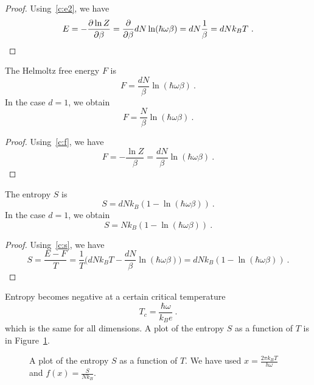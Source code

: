     \begin{proof}
        Using~\eqref{c:e2}, we have
        \begin{equation*}
            E = - \frac{\partial\ln Z}{\partial\beta} = \frac{\partial}{\partial\beta} d N \ln (\hbar \omega \beta) = d N \frac{1}{\beta} = d N k_B T ~.
        \end{equation*}
    \end{proof}
    The Helmoltz free energy $F$ is 
    \begin{equation*}
        F = \frac{dN}{\beta} \ln (\hbar \omega \beta) ~.
    \end{equation*}
    In the case $d = 1$, we obtain 
    \begin{equation*}
        F = \frac{N}{\beta} \ln (\hbar \omega \beta) ~.
    \end{equation*}
    \begin{proof}
        Using~\eqref{c:f}, we have
        \begin{equation*}
            F = - \frac{\ln Z}{\beta} = \frac{dN}{\beta} \ln (\hbar \omega \beta) ~.
        \end{equation*}
    \end{proof}
    The entropy $S$ is 
    \begin{equation*}
        S = d N k_B (1 - \ln (\hbar \omega \beta)) ~.
    \end{equation*}
    In the case $d=1$, we obtain 
    \begin{equation*}
        S = N k_B (1 - \ln (\hbar \omega \beta)) ~.
    \end{equation*}
    \begin{proof}
        Using~\eqref{c:s}, we have
        \begin{equation*}
            S = \frac{E - F}{T} = \frac{1}{T} \Big ( d N k_B T - \frac{dN}{\beta} \ln (\hbar \omega \beta) \Big ) = d N k_B (1 - \ln (\hbar \omega \beta)) ~.
        \end{equation*}
    \end{proof}
    Entropy becomes negative at a certain critical temperature
    \begin{equation*}
        T_c = \frac{\hbar \omega}{k_B e} ~.
    \end{equation*}
    which is the same for all dimensions.
    A plot of the entropy $S$ as a function of $T$ is in Figure~\ref{fig:c:ent2}.
    \begin{figure}
        \centering
        \caption{A plot of the entropy $S$ as a function of $T$. We have used $x = \frac{2 \pi k_B T}{h \omega}$ and $f(x) = \frac{S}{N k_B}$.}
        \label{fig:c:ent2}
    \end{figure}
